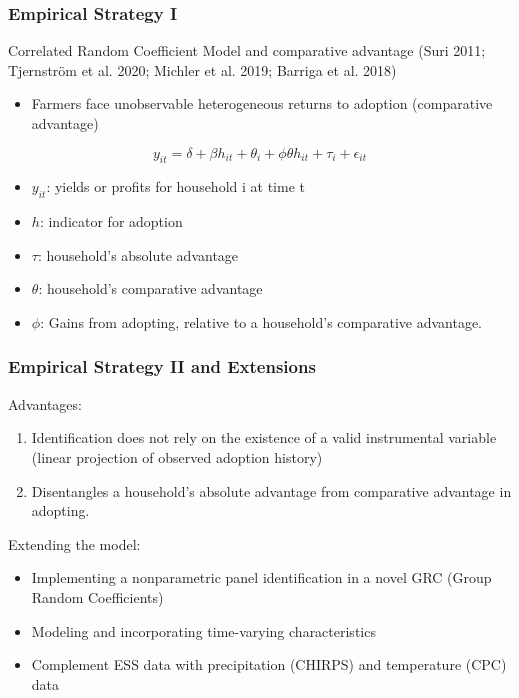 \documentclass{beamer}
\begin{document}
\begin{frame}
\frametitle{Empirical Strategy I}

Correlated Random Coefficient Model and comparative advantage (Suri 2011; Tjernstr\"{o}m et al. 2020; Michler et al. 2019; Barriga et al. 2018)


\begin{itemize}
    \item Farmers face unobservable heterogeneous returns to adoption (comparative advantage)
\end{itemize}  

\begin{center}
$$
    y_{it}= \delta + \beta h_{it} + \theta_{i} + \phi\theta h_{it} + \tau_{i} + \epsilon_{it}
$$  
\end{center}

\begin{itemize}
    \item $y_{it}$: yields or profits for household i at time t
    \item $h$:  indicator for adoption
    \item $\tau$:  household’s absolute advantage
    \item $\theta$: household’s comparative advantage
    \item $\phi$: Gains from adopting, relative to a household’s comparative advantage. 
\end{itemize}

\end{frame}


\begin{frame}
\frametitle{Empirical Strategy II and Extensions}

Advantages:
\begin{enumerate}
    \item Identification does not rely on the existence of a valid instrumental variable (linear projection of observed adoption history)
    \item Disentangles a household’s absolute advantage from comparative advantage in adopting. 
\end{enumerate}

Extending the model:

\begin{itemize}
    \item Implementing a nonparametric panel identification in a novel GRC (Group Random Coefficients)
    \item Modeling and incorporating time-varying characteristics 
    \item Complement ESS data with precipitation (CHIRPS) and temperature (CPC) data
\end{itemize}  
\end{frame}


\end{document}
